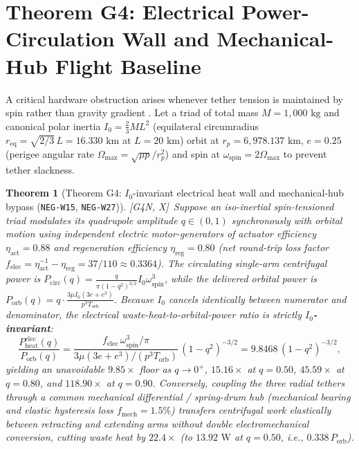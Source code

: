 \documentclass[11pt]{amsart}
\numberwithin{equation}{section}
\theoremstyle{plain}
\newtheorem{theorem}{Theorem}[section]
\theoremstyle{definition}\newtheorem{definition}[theorem]{Definition}
\theoremstyle{remark}\newtheorem{remark}[theorem]{Remark}
\newcommand{\ctag}[1]{\textup{\textsf{\scriptsize[#1]}}}
\begin{document}
\section{Theorem G4: Electrical Power-Circulation Wall and Mechanical-Hub Flight Baseline}
A critical hardware obstruction arises whenever tether tension is maintained by spin rather than gravity gradient \cite{beletsky1993}. Let a triad of total mass $M = 1{,}000\text{ kg}$ and canonical polar inertia $I_0 = \frac23 M L^2$ (equilateral circumradius $r_{\mathrm{eq}} = \sqrt{2/3}\,L = 16.330\text{ km}$ at $L = 20\text{ km}$) orbit at $r_p = 6{,}978.137\text{ km}$, $e = 0.25$ (perigee angular rate $\Omega_{\max} = \sqrt{\mu p}/r_p^2$) and spin at $\omega_{\mathrm{spin}} = 2\Omega_{\max}$ to prevent tether slackness.

\begin{theorem}[Theorem G4: $I_0$-invariant electrical heat wall and mechanical-hub bypass (\texttt{NEG-W15}, \texttt{NEG-W27})]\label{thm:G4}
\ctag{G4N, X}\ Suppose an iso-inertial spin-tensioned triad modulates its quadrupole amplitude $q \in (0,1)$ synchronously with orbital motion using independent electric motor-generators of actuator efficiency $\eta_{\mathrm{act}} = 0.88$ and regeneration efficiency $\eta_{\mathrm{reg}} = 0.80$ (net round-trip loss factor $f_{\mathrm{elec}} = \eta_{\mathrm{act}}^{-1} - \eta_{\mathrm{reg}} = 37/110 \approx 0.3364$). The circulating single-arm centrifugal power is $P_{\mathrm{circ}}(q) = \frac{q}{\pi(1 - q^2)^{3/2}} I_0 \omega_{\mathrm{spin}}^3$, while the delivered orbital power is $P_{\mathrm{orb}}(q) = q \cdot \frac{3\mu I_0(3e + e^3)}{p^3 T_{\mathrm{orb}}}$. Because $I_0$ cancels identically between numerator and denominator, the electrical waste-heat-to-orbital-power ratio is strictly \textbf{$I_0$-invariant}:
\begin{equation}\label{eq:G4_ratio}
\frac{P_{\mathrm{heat}}^{\mathrm{elec}}(q)}{P_{\mathrm{orb}}(q)} = \frac{f_{\mathrm{elec}}\,\omega_{\mathrm{spin}}^3 / \pi}{3\mu(3e + e^3)/(p^3 T_{\mathrm{orb}})}\,(1 - q^2)^{-3/2} = 9.8468\,(1 - q^2)^{-3/2},
\end{equation}
yielding an unavoidable $9.85\times$ floor as $q \to 0^+$, $15.16\times$ at $q = 0.50$, $45.59\times$ at $q = 0.80$, and $118.90\times$ at $q = 0.90$. Conversely, coupling the three radial tethers through a common mechanical differential / spring-drum hub (mechanical bearing and elastic hysteresis loss $f_{\mathrm{mech}} = 1.5\%$) transfers centrifugal work elastically between retracting and extending arms without double electromechanical conversion, cutting waste heat by $22.4\times$ (to $13.92\text{ W}$ at $q = 0.50$, i.e., $0.338\,P_{\mathrm{orb}}$).
\end{theorem}
\end{document}
